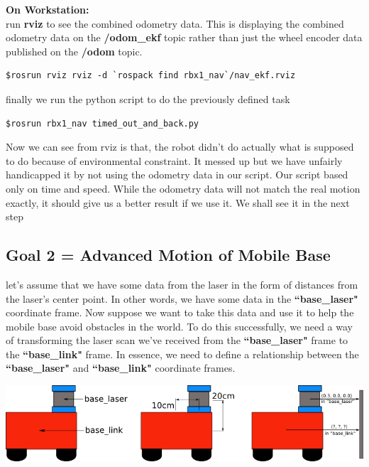\documentclass[10pt,a4paper]{article}
\begin{document}
\textbf{On Workstation:}\\
run \textbf{rviz} to see the combined odometry data. This is displaying the combined odometry data on the \textbf{/odom\_ekf} topic rather than just the wheel encoder data published on the \textbf{/odom} topic.
\begin{lstlisting}[frame=single] 
$rosrun rviz rviz -d `rospack find rbx1_nav`/nav_ekf.rviz
\end{lstlisting}
finally we run the python script to do the previously defined task 
\begin{lstlisting}[frame=single] 
$rosrun rbx1_nav timed_out_and_back.py
\end{lstlisting}

Now we can see from rviz is that, the robot didn't do actually what is supposed to do
because of environmental constraint. It messed up but we have unfairly handicapped it 
by not using the odometry data in our script. Our script based only on time and speed. 
While the odometry data will not match the real motion exactly, 
it should give us a better result if we use it. We shall see it in the next step

\subsection{Goal 2 = Advanced Motion of Mobile Base}
let's assume that we have some data from the laser in the form of distances from the laser's center point. In other words, we have some data in the \textbf{``base\_laser"} coordinate frame. Now suppose we want to take this data and use it to help the mobile base avoid obstacles in the world. To do this successfully, we need a way of transforming the laser scan we've received from the \textbf{``base\_laser"} frame to the \textbf{``base\_link"} frame. In essence, we need to define a relationship between the \textbf{``base\_laser"} and \textbf{``base\_link"} coordinate frames.\\

\begin{center}
\includegraphics[width=\textwidth]{simple_robot.png}\\
\end{center}
\end{document}
